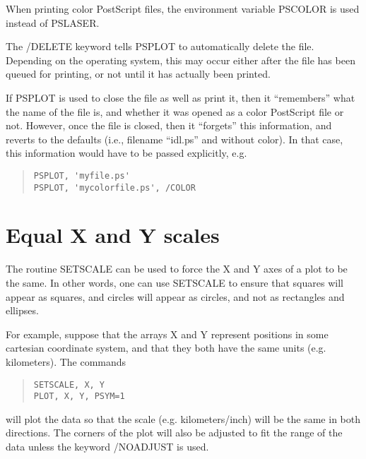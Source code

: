 When printing color PostScript files, the environment variable PSCOLOR is used
instead of PSLASER.

The /DELETE keyword tells PSPLOT to automatically delete the file.  Depending
on the operating system, this may occur either after the file has been queued
for printing, or not until it has actually been printed.

If PSPLOT is used to close the file as well as print it, then it ``remembers''
what the name of the file is, and whether it was opened as a color PostScript
file or not.  However, once the file is closed, then it ``forgets'' this
information, and reverts to the defaults (i.e., filename ``idl.ps'' and without
color).  In that case, this information would have to be passed explicitly,
e.g.
\begin{quote}
\begin{verbatim}
PSPLOT, 'myfile.ps'
PSPLOT, 'mycolorfile.ps', /COLOR
\end{verbatim}
\end{quote}

\section{Equal X and Y scales}

The routine SETSCALE can be used to force the X and Y axes of a plot to be the
same.  In other words, one can use SETSCALE to ensure that squares will appear
as squares, and circles will appear as circles, and not as rectangles and
ellipses.

For example, suppose that the arrays X and Y represent positions in some
cartesian coordinate system, and that they both have the same units (e.g.
kilometers).  The commands
\begin{quote}
\begin{verbatim}
SETSCALE, X, Y
PLOT, X, Y, PSYM=1
\end{verbatim}
\end{quote}
will plot the data so that the scale (e.g. kilometers/inch) will be the same in
both directions.  The corners of the plot will also be adjusted to fit the
range of the data unless the keyword /NOADJUST is used.

